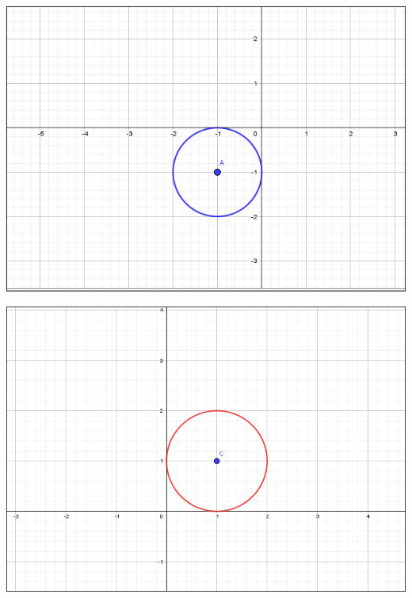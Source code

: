 \documentclass[12pt, addpoints, answers]{exam}
\begin{document}
\begin{questions}
\begin{parts}
    \end{parts}	
\par\vspace{0.5cm}
\noindent 
\begin{minipage}[t]{0.23\linewidth}
	\includegraphics[width=1\linewidth]{Figuras/fig9}
\end{minipage}\hfill
 \begin{minipage}[t]{0.23\linewidth}
 	\includegraphics[width=1\linewidth]{Figuras/fig10}
 \end{minipage}\hfill
 \begin{minipage}[t]{0.23\linewidth}

\end{minipage}
\end{questions}
\end{document}
